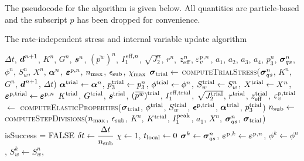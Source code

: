   The pseudocode for the algorithm is given below.  All quantities are particle-based and the
  subscript $p$ has been dropped for convenience.
\begin{breakablealgorithm}
  \caption{The rate-independent stress and internal variable update algorithm}
  \begin{algorithmic}[1]
    \Require $\Delta t$, $\boldsymbol{d}^{n+1}$, 
             $K^n$, $G^n$, $\boldsymbol{s}^n$, $(\bar{p^w})^n$, $I_1^{\text{eff},n}$, 
             $\sqrt{J_2^n}$, $r^n$, $z_{\text{eff}}^n$, $\varepsilon_v^{\text{p},n}$,
             $a_1$, $a_2$, $a_3$, $a_4$, $p_3^n$, 
             $\boldsymbol{\sigma}_{qs}^n$, $\phi^n$, $S_w^n$, $X^n$, $\boldsymbol{\alpha}^n$, $\boldsymbol{\varepsilon}^{\text{p},n}$,
             $n_{\text{max}}$, $\epsilon_{\text{sub}}$, $\chi_{\text{max}}$ 
      \State $\boldsymbol{\sigma}_{\text{trial}} \leftarrow$ \textsc{computeTrialStress}($\boldsymbol{\sigma}_{qs}^n$, $K^n$, $G^n$, 
                                                                  $\boldsymbol{d}^{n+1}$, $\Delta t$)
      \State $\boldsymbol{\alpha}^{\text{trial}} \leftarrow \boldsymbol{\alpha}^n$, 
             $p_3^{\text{trial}} \leftarrow p_3^n$, 
             $\phi^{\text{trial}} \leftarrow \phi^n$, 
             $S_w^{\text{trial}} \leftarrow S_w^n$, \WRP
             $X^{\text{trial}} \leftarrow X^n$, 
             $\boldsymbol{\varepsilon}^{\text{p},\text{trial}} \leftarrow \boldsymbol{\varepsilon}^{\text{p},n}$ 
      \State $K^{\text{trial}}$, $G^{\text{trial}}$, $\boldsymbol{s}^{\text{trial}}$, $(\bar{p^w})^\Trial$, $I_1^{\text{eff},\text{trial}}$, 
             $\sqrt{J_2^{\text{trial}}}$, $r^{\text{trial}}$, $z_{\text{eff}}^{\text{trial}}$, $\varepsilon_v^{\text{p},\text{trial}}$ $\leftarrow$ \WRP
          \textsc{computeElasticProperties}($\boldsymbol{\sigma}_{\text{trial}}$, 
             $\phi^{\text{trial}}$, $S_w^{\text{trial}}$, $\boldsymbol{\epsilon}^{\text{p},\text{trial}}$, $\boldsymbol{\alpha}^{\text{trial}}$, $p_3^{\text{trial}}$)
      \State $n_{\text{sub}} \leftarrow $ \textsc{computeStepDivisions}($n_{\text{max}}$, $\epsilon_{\text{sub}}$, $K^n$, 
               $K^{\text{trial}}$, $I_1^{\text{peak}}$, $a_1$, $X^n$, $\boldsymbol{\sigma}_{qs}^n$, $\boldsymbol{\sigma}_{\text{trial}}$) \WRP
        \State \Return isSuccess = FALSE
      \EndIf
      \State $\delta t \leftarrow \cfrac{\Delta t}{n_{\text{sub}}}$
      \State $\chi \leftarrow 1$, $t_{\text{local}} \leftarrow 0$
      \State $\boldsymbol{\sigma}^k \leftarrow \boldsymbol{\sigma}_{qs}^n$, $\boldsymbol{\varepsilon}^{\text{p},k} \leftarrow \boldsymbol{\varepsilon}^{\text{p},n}$,
             $\phi^k \leftarrow \phi^n$, $S_w^k \leftarrow S_w^n$,

\end{algorithmic}
\end{breakablealgorithm}
